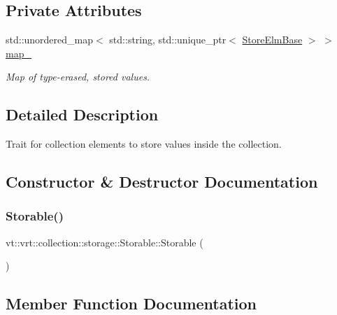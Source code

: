 \subsection*{Private Attributes}
\begin{DoxyCompactItemize}
\item 
std\+::unordered\+\_\+map$<$ std\+::string, std\+::unique\+\_\+ptr$<$ \hyperlink{structvt_1_1vrt_1_1collection_1_1storage_1_1_store_elm_base}{Store\+Elm\+Base} $>$ $>$ \hyperlink{structvt_1_1vrt_1_1collection_1_1storage_1_1_storable_ade35c0e0ef45b53ffad56cbc349cfb82}{map\+\_\+}
\begin{DoxyCompactList}\small\item\em Map of type-\/erased, stored values. \end{DoxyCompactList}\end{DoxyCompactItemize}


\subsection{Detailed Description}
Trait for collection elements to store values inside the collection. 

\subsection{Constructor \& Destructor Documentation}
\mbox{\label{structvt_1_1vrt_1_1collection_1_1storage_1_1_storable_aa6cb609d17c3fffd1416842cf9cc27e9}} 
\subsubsection{\texorpdfstring{Storable()}{Storable()}}
{\footnotesize\ttfamily vt\+::vrt\+::collection\+::storage\+::\+Storable\+::\+Storable (\begin{DoxyParamCaption}{ }\end{DoxyParamCaption})\hspace{0.3cm}{\ttfamily [default]}}



\subsection{Member Function Documentation}
\mbox{\label{structvt_1_1vrt_1_1collection_1_1storage_1_1_storable_a9fac390a50e3de2776afb730dd3c0418}} 
